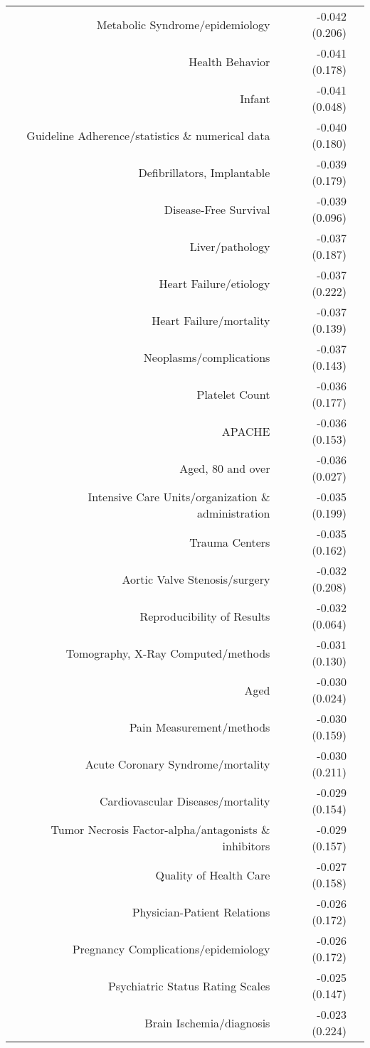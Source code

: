 \begin{longtable}[l]{rr@{}l@{ }}
Metabolic Syndrome/epidemiology & -0.042 (0.206) & $^{}$\\
Health Behavior & -0.041 (0.178) & $^{}$\\
Infant & -0.041 (0.048) & $^{}$\\
Guideline Adherence/statistics \& numerical data & -0.040 (0.180) & $^{}$\\
Defibrillators, Implantable & -0.039 (0.179) & $^{}$\\
Disease-Free Survival & -0.039 (0.096) & $^{}$\\
Liver/pathology & -0.037 (0.187) & $^{}$\\
Heart Failure/etiology & -0.037 (0.222) & $^{}$\\
Heart Failure/mortality & -0.037 (0.139) & $^{}$\\
Neoplasms/complications & -0.037 (0.143) & $^{}$\\
Platelet Count & -0.036 (0.177) & $^{}$\\
APACHE & -0.036 (0.153) & $^{}$\\
Aged, 80 and over & -0.036 (0.027) & $^{}$\\
Intensive Care Units/organization \& administration & -0.035 (0.199) & $^{}$\\
Trauma Centers & -0.035 (0.162) & $^{}$\\
Aortic Valve Stenosis/surgery & -0.032 (0.208) & $^{}$\\
Reproducibility of Results & -0.032 (0.064) & $^{}$\\
Tomography, X-Ray Computed/methods & -0.031 (0.130) & $^{}$\\
Aged & -0.030 (0.024) & $^{}$\\
Pain Measurement/methods & -0.030 (0.159) & $^{}$\\
Acute Coronary Syndrome/mortality & -0.030 (0.211) & $^{}$\\
Cardiovascular Diseases/mortality & -0.029 (0.154) & $^{}$\\
Tumor Necrosis Factor-alpha/antagonists \& inhibitors & -0.029 (0.157) & $^{}$\\
Quality of Health Care & -0.027 (0.158) & $^{}$\\
Physician-Patient Relations & -0.026 (0.172) & $^{}$\\
Pregnancy Complications/epidemiology & -0.026 (0.172) & $^{}$\\
Psychiatric Status Rating Scales & -0.025 (0.147) & $^{}$\\
Brain Ischemia/diagnosis & -0.023 (0.224) & $^{}$\\

\end{longtable}
